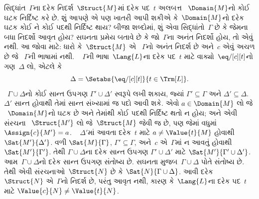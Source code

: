 %
\begin{ex}
સિદ્ધાંત~$\Gamma$ના દરેક નિદર્શ~$\Struct{M}$માં દરેક પદ~$t$ અલબત્ત
~$\Domain{M}$નો કોઈ ઘટક નિર્દિષ્ટ કરે છે. શું આપણે એ પણ
ખાતરી આપી શકીએ કે~$\Domain{M}$નો દરેક ઘટક કોઈ ને કોઈ પદથી
નિર્દિષ્ટ થાય? બીજા શબ્દોમાં, શું એવા સિદ્ધાંતો~$\Gamma$ છે કે જેમના
બધા નિદર્શો આવૃત હોય? સઘનતા પ્રમેય બતાવે છે કે જો~$\Gamma$ના અનંત
નિદર્શો હોય, તો એવું નથી. આ જોવા માટે: ધારો કે~$\Struct{M}$ એ
~$\Gamma$નો અનંત નિદર્શ છે અને~$c$ એવું અચળ છે જે
~$\Gamma$ની ભાષામાં નથી. ~ $\Gamma$ની ભાષા~$\Lang{L}$ના દરેક પદ~$t$
માટે વાક્યો~$\eq/[c][t]$નો ગણ~$\Delta$ લો, એટલે કે
  \[
  \Delta = \Setabs{\eq/[c][t]}{t \in \Trm[L]}.
  \]
~$\Gamma\cup\Delta$નો કોઈ સાન્ત ઉપગણ $\Gamma'\cup\Delta'$ સ્વરૂપે
લખી શકાય, જ્યાં $\Gamma'\subseteq\Gamma$ અને
$\Delta'\subseteq\Delta$. ~ $\Delta'$ સાન્ત હોવાથી તેમાં સાન્ત
સંખ્યામાં જ પદો આવી શકે. એવો $a \in \Domain{M}$ લો જે
~$\Domain{M}$નો ઘટક છે અને તેમાંથી કોઈ પદથી નિર્દિષ્ટ થતો ન
હોય; અને એવી સંરચના
~$\Struct{M'}$ લો જે~$\Struct{M}$ જેવી જ છે, પણ જેમાં વધુમાં
$\Assign{c}{M'}=a$. ~ $\Delta'$માં આવતા દરેક~$t$ માટે
$a\neq\Value{t}{M}$ હોવાથી $\Sat{M'}{\Delta'}$. વળી
$\Sat{M}{\Gamma}$, $\Gamma'\subseteq\Gamma$, અને~$c$ એ~$\Gamma$માં
ન આવતું હોવાથી $\Sat{M'}{\Gamma'}$. તેથી
$\Gamma\cup\Delta$ના દરેક સાન્ત ઉપગણ $\Gamma'\cup\Delta'$ માટે
$\Sat{M'}{\Gamma'\cup\Delta'}$. આમ~$\Gamma\cup\Delta$નો દરેક સાન્ત
ઉપગણ સંતોષ્ય છે. સઘનતા મુજબ~$\Gamma\cup\Delta$ પોતે સંતોષ્ય છે.
તેથી એવી સંરચનાઓ~$\Struct{N}$ છે કે
$\Sat{N}{\Gamma\cup\Delta}$. આવી દરેક~$\Struct{N}$ એ~$\Gamma$નો
નિદર્શ છે, પરંતુ આવૃત નથી, કારણ કે~$\Lang{L}$ના દરેક પદ~$t$ માટે
$\Value{c}{N}\neq\Value{t}{N}$.
\end{ex}


